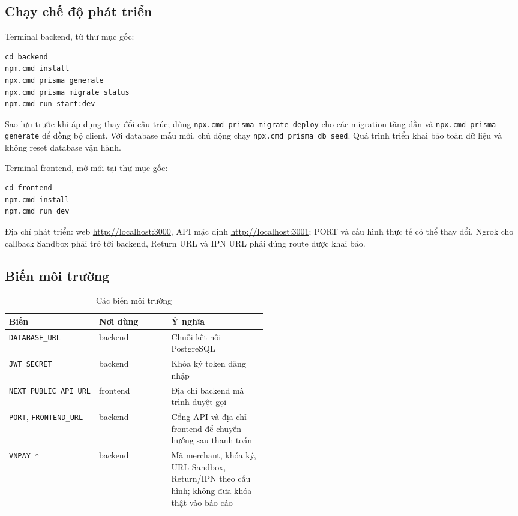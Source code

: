 \documentclass[a4paper]{article}
\begin{document}
\subsection{Chạy chế độ phát triển}
Terminal backend, từ thư mục gốc:
\begin{lstlisting}[style=brew,language={}]
cd backend
npm.cmd install
npx.cmd prisma generate
npx.cmd prisma migrate status
npm.cmd run start:dev
\end{lstlisting}
Sao lưu trước khi áp dụng thay đổi cấu trúc; dùng \texttt{npx.cmd prisma migrate deploy} cho các migration tăng dần và \texttt{npx.cmd prisma generate} để đồng bộ client. Với database mẫu mới, chủ động chạy \texttt{npx.cmd prisma db seed}. Quá trình triển khai bảo toàn dữ liệu và không reset database vận hành.

Terminal frontend, mở mới tại thư mục gốc:
\begin{lstlisting}[style=brew,language={}]
cd frontend
npm.cmd install
npm.cmd run dev
\end{lstlisting}
Địa chỉ phát triển: web \url{http://localhost:3000}, API mặc định \url{http://localhost:3001}; PORT và cấu hình thực tế có thể thay đổi. Ngrok cho callback Sandbox phải trỏ tới backend, Return URL và IPN URL phải đúng route được khai báo.

\subsection{Biến môi trường}
\begin{table}[h!]
\centering
\footnotesize
\begin{tabularx}{\textwidth}{|p{0.22\linewidth}|p{0.28\linewidth}|X|}
\hline
\textbf{Biến} & \textbf{Nơi dùng} & \textbf{Ý nghĩa} \\ \hline
\texttt{DATABASE\_URL} & backend & Chuỗi kết nối PostgreSQL \\ \hline
\texttt{JWT\_SECRET} & backend & Khóa ký token đăng nhập \\ \hline
\texttt{NEXT\_PUBLIC\_API\_URL} & frontend & Địa chỉ backend mà trình duyệt gọi \\ \hline
\texttt{PORT}, \texttt{FRONTEND\_URL} & backend & Cổng API và địa chỉ frontend để chuyển hướng sau thanh toán \\ \hline
\texttt{VNPAY\_*} & backend & Mã merchant, khóa ký, URL Sandbox, Return/IPN theo cấu hình; không đưa khóa thật vào báo cáo \\ \hline
\end{tabularx}
\caption{Các biến môi trường}
\end{table}
\end{document}
